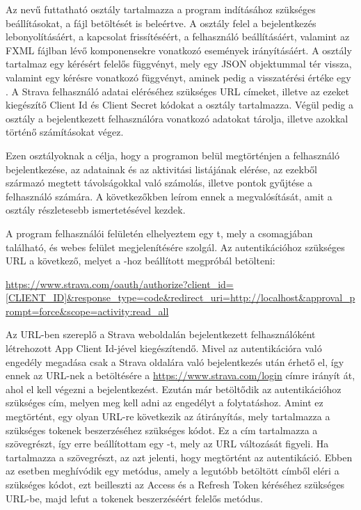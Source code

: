 Az  nevű futtatható osztály tartalmazza a program indításához szükséges beállításokat, a  fájl betöltését is beleértve.
A  osztály felel a bejelentkezés lebonyolításáért, a kapcsolat frissítéséért, a felhasználó beállításáért, valamint az FXML fájlban lévő komponensekre vonatkozó események irányításáért.
A  osztály tartalmaz egy  kérésért felelős függvényt, mely egy JSON objektummal tér vissza, valamint egy  kérésre vonatkozó függvényt, aminek pedig a visszatérési értéke egy .
A Strava felhasználó adatai eléréséhez szükséges URL címeket, illetve az ezeket kiegészítő Client Id és Client Secret kódokat a  osztály tartalmazza.
Végül pedig a  osztály a bejelentkezett felhasználóra vonatkozó adatokat tárolja, illetve azokkal történő számításokat végez. 

Ezen osztályoknak a célja, hogy a programon belül megtörténjen a felhasználó bejelentkezése, az adatainak és az aktivitási listájának elérése, az ezekből származó megtett távolságokkal való számolás, illetve pontok gyűjtése a felhasználó számára.
A következőkben leírom ennek a megvalósítását, amit a  osztály részletesebb ismertetésével kezdek. 

A program felhasználói felületén elhelyeztem egy t, mely a  csomagjában található, és webes felület megjelenítésére szolgál.
Az autentikációhoz szükséges URL a következő, melyet a -hoz beállított  megpróbál betölteni: 

\url{
https://www.strava.com/oauth/authorize?client_id=[CLIENT_ID]&response_type=code&redirect_uri=http://localhost&approval_prompt=force&scope=activity:read_all 
}

Az URL-ben szereplő \CodeName{[CLIENT\_ID]} a Strava weboldalán bejelentkezett felhasználóként létrehozott App Client Id-jével kiegészítendő.
Mivel az autentikációra való engedély megadása csak a Strava oldalára való bejelentkezés után érhető el, így ennek az URL-nek a betöltésére a \url{https://www.strava.com/login} címre irányít át, ahol el kell végezni a bejelentkezést.
Ezután már betöltődik az autentikációhoz szükséges cím, melyen meg kell adni az engedélyt a folytatáshoz.
Amint ez megtörtént, egy olyan URL-re következik az átirányítás, mely tartalmazza a szükséges tokenek beszerzéséhez szükséges kódot.
Ez a cím tartalmazza a  szövegrészt, így erre beállítottam egy -t, mely az URL változását figyeli.
Ha tartalmazza a  szövegrészt, az azt jelenti, hogy megtörtént az autentikáció.
Ebben az esetben meghívódik egy metódus, amely a legutóbb betöltött címből eléri a szükséges kódot, ezt beilleszti az Access és a Refresh Token kéréséhez szükséges URL-be, majd lefut a tokenek beszerzéséért felelős metódus. 

